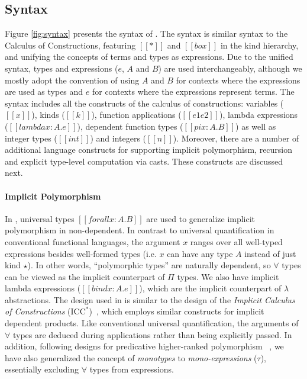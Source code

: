 \subsection{Syntax}

Figure \ref{fig:syntax} presents the syntax of \name. The syntax is similar
syntax to the Calculus of Constructions, featuring
$[[*]]$ and $[[box]]$ in the kind hierarchy, and unifying the concepts of terms
and types as expressions. Due to the unified syntax, types and
expressions ($e$, $A$ and $B$) are used
interchangeably, although we mostly adopt the convention of using $A$ and $B$
for contexts where the expressions are used as types and $e$ for contexts
where the expressions represent terms.
The syntax includes all the constructs of the calculus of constructions:
variables ($[[x]]$), kinds ($[[k]]$), function applications  ($[[e1 e2]]$),
lambda expressions ($[[lambda x : A. e]]$), dependent function types ($[[pi x : A. B]]$)
as well as integer types ($[[int]]$) and integers ($[[n]]$).
Moreover, there are a number of additional language constructs for
supporting implicit polymorphism, recursion and explicit type-level computation
via casts. These constructs are discussed next.

\paragraph{Implicit Polymorphism}
In \name, universal types $[[forall x : A. B]]$ are used to generalize implicit
polymorphism in non-dependent.
In contrast to universal quantification in conventional functional languages, the
argument $x$ ranges over all well-typed expressions besides well-formed
types (i.e. $x$ can have any type $A$ instead of just kind $\star$).
In other words, ``polymorphic types'' are naturally dependent, so $\forall$
types can be viewed as the implicit counterpart of $\Pi$ types. We also have
implicit lambda expressions ($[[bind x : A. e]]$), which are the implicit counterpart of
  $\lambda$ abstractions. The design used in \name
  is similar to the design of the \emph{Implicit Calculus of Constructions} ($\text{ICC}^*$)~\cite{barras2008implicit}, which
  employs similar constructs for implicit dependent products.
Like conventional universal quantification, the arguments of $\forall$ types are
deduced during applications rather than being explicitly passed.
In addition, following designs for predicative higher-ranked polymorphism~
\cite{odersky1996putting,dunfield2013complete,jones2007practical},
we have also generalized the concept of \emph{monotypes} to
\emph{mono-expressions} ($\tau$), essentially excluding $\forall$ types from expressions.

